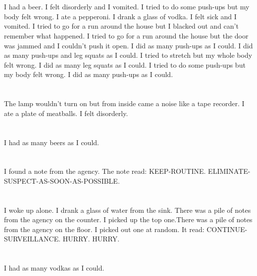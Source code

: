 \documentclass{article}
\begin{document}
    \section{}
    I had a beer. I felt disorderly and I vomited. I tried to do some push-ups but my body felt wrong. I ate a pepperoni. I drank a glass of vodka. I felt sick and I vomited.  I tried to go for a run around the house but I blacked out and can't remember what happened.  I tried to go for a run around the house but the door was jammed and I couldn't push it open.  I did as many push-ups as I could.  I did as many push-ups and leg squats as I could.   I tried to stretch but my whole body felt wrong.  I did as many leg squats as I could.  I tried to do some push-ups but my body felt wrong.  I did as many push-ups as I could.  
    \newpage
    
    \section{}
    The lamp wouldn't turn on but from inside came a noise like a tape recorder. I ate a plate of meatballs. I felt disorderly.  
    \newpage
    
    \section{}
    I had as many beers as I could.  
    \newpage
    
    \section{}
    I found a note from the agency. The note read: KEEP-ROUTINE. ELIMINATE-SUSPECT-AS-SOON-AS-POSSIBLE.  
    \newpage
    
    \section{}
    I woke up alone. I drank a glass of water from the sink. There was a pile of notes from the agency on the counter. I picked up the top one.There was a pile of notes from the agency on the floor. I picked out one at random. It read: CONTINUE-SURVEILLANCE. HURRY. HURRY.  
    \newpage
    
    \section{}
    I had as many vodkas as I could.  
    \newpage
    
\end{document}
